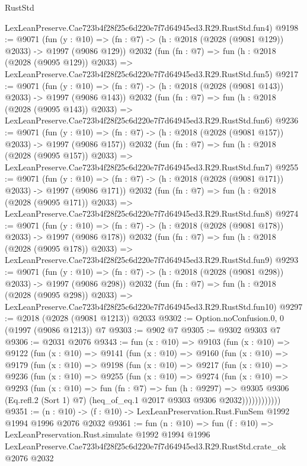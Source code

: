 \begin{lexlean}{RustStd}
\begin{coremodule}
    LexLeanPreserve.Cae723b4f28f25c6d220e7f7d64945ed3.R29.RustStd.fun4)
@9198 := @9071
    (fun (y : @10) => (fn : @7) -> (h : @2018 (@2028 (@9081 @129)) @2033) -> @1997 (@9086 @129))
    @2032
    (fun (fn : @7) =>
    fun (h : @2018 (@2028 (@9095 @129)) @2033) =>
    LexLeanPreserve.Cae723b4f28f25c6d220e7f7d64945ed3.R29.RustStd.fun5)
@9217 := @9071
    (fun (y : @10) => (fn : @7) -> (h : @2018 (@2028 (@9081 @143)) @2033) -> @1997 (@9086 @143))
    @2032
    (fun (fn : @7) =>
    fun (h : @2018 (@2028 (@9095 @143)) @2033) =>
    LexLeanPreserve.Cae723b4f28f25c6d220e7f7d64945ed3.R29.RustStd.fun6)
@9236 := @9071
    (fun (y : @10) => (fn : @7) -> (h : @2018 (@2028 (@9081 @157)) @2033) -> @1997 (@9086 @157))
    @2032
    (fun (fn : @7) =>
    fun (h : @2018 (@2028 (@9095 @157)) @2033) =>
    LexLeanPreserve.Cae723b4f28f25c6d220e7f7d64945ed3.R29.RustStd.fun7)
@9255 := @9071
    (fun (y : @10) => (fn : @7) -> (h : @2018 (@2028 (@9081 @171)) @2033) -> @1997 (@9086 @171))
    @2032
    (fun (fn : @7) =>
    fun (h : @2018 (@2028 (@9095 @171)) @2033) =>
    LexLeanPreserve.Cae723b4f28f25c6d220e7f7d64945ed3.R29.RustStd.fun8)
@9274 := @9071
    (fun (y : @10) => (fn : @7) -> (h : @2018 (@2028 (@9081 @178)) @2033) -> @1997 (@9086 @178))
    @2032
    (fun (fn : @7) =>
    fun (h : @2018 (@2028 (@9095 @178)) @2033) =>
    LexLeanPreserve.Cae723b4f28f25c6d220e7f7d64945ed3.R29.RustStd.fun9)
@9293 := @9071
    (fun (y : @10) => (fn : @7) -> (h : @2018 (@2028 (@9081 @298)) @2033) -> @1997 (@9086 @298))
    @2032
    (fun (fn : @7) =>
    fun (h : @2018 (@2028 (@9095 @298)) @2033) =>
    LexLeanPreserve.Cae723b4f28f25c6d220e7f7d64945ed3.R29.RustStd.fun10)
@9297 := @2018 (@2028 (@9081 @1213)) @2033
@9302 := Option.noConfusion.{0, 0} (@1997 (@9086 @1213)) @7
@9303 := @902 @7
@9305 := @9302 @9303 @7
@9306 := @2031 @2076
@9343 := fun (x : @10) =>
  @9103
    (fun (x : @10) =>
    @9122
      (fun (x : @10) =>
      @9141
        (fun (x : @10) =>
        @9160
          (fun (x : @10) =>
          @9179
            (fun (x : @10) =>
            @9198
              (fun (x : @10) =>
              @9217
                (fun (x : @10) =>
                @9236
                  (fun (x : @10) =>
                  @9255
                    (fun (x : @10) =>
                    @9274
                      (fun (x : @10) =>
                      @9293
                        (fun (x : @10) =>
                        fun (fn : @7) =>
                        fun (h : @9297) =>
                        @9305
                          @9306
                          (Eq.refl.{2} (Sort 1) @7)
                          (heq_of_eq.{1} @2017 @9303 @9306 @2032))))))))))))
@9351 := (n : @10) -> (f : @10) -> LexLeanPreservation.Rust.FunSem @1992 @1994 @1996 @2076 @2032
@9361 := fun (n : @10) =>
  fun (f : @10) =>
  LexLeanPreservation.Rust.simulate
    @1992
    @1994
    @1996
    LexLeanPreserve.Cae723b4f28f25c6d220e7f7d64945ed3.R29.RustStd.crate_ok
    @2076
    @2032
\end{coremodule}
\end{lexlean}
